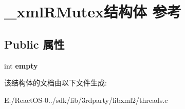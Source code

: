 \hypertarget{struct__xml_r_mutex}{}\section{\+\_\+xml\+R\+Mutex结构体 参考}
\label{struct__xml_r_mutex}
\subsection*{Public 属性}
\begin{DoxyCompactItemize}
\item 
\mbox{\label{struct__xml_r_mutex_ae6811da98688fb42e1720626ac61f3c4}} 
int {\bfseries empty}
\end{DoxyCompactItemize}


该结构体的文档由以下文件生成\+:\begin{DoxyCompactItemize}
\item 
E\+:/\+React\+O\+S-\/0../sdk/lib/3rdparty/libxml2/threads.\+c\end{DoxyCompactItemize}
